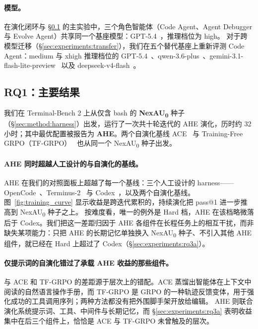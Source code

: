 \paragraph{模型。}
在演化闭环与 \S\ref{sec:experiments:main} 的主实验中，三个角色智能体（Code Agent、Agent Debugger 与 Evolve Agent）共享同一个基座模型：GPT-5.4~\citep{openaiIntroducingGPT542026}，推理档位为 high。
对于跨模型迁移（\S\ref{sec:experiments:transfer}），我们在五个替代基座上重新评测 Code Agent：medium 与 xhigh 推理档位的 GPT-5.4~\citep{openaiIntroducingGPT542026}、qwen-3.6-plus~\citep{teamQwen36PlusRealWorld2026,yangQwen3TechnicalReport2025a}、gemini-3.1-flash-lite-preview~\citep{googleGemini31FlashLiteModelCard2026} 以及 deepseek-v4-flash~\citep{DeepSeek_V4pdfDeepseekaiDeepSeekV4Pro2026}。

\subsection{RQ1：主要结果}
\label{sec:experiments:main}

% 


我们在 Terminal-Bench 2 上从仅含 bash 的 \textbf{NexAU\textsubscript{0}} 种子（\S\ref{sec:method:harness}）出发，运行了一次共十轮迭代的 AHE 演化，历时约 32 小时；其中最优配置被报告为 \textbf{AHE}。两个自演化基线 ACE~\citep{zhangAgenticContextEngineering2025a} 与 Training-Free GRPO（TF-GRPO）~\citep{caiTrainingFreeGroupRelative2025} 也从同一个 NexAU\textsubscript{0} 种子出发。

\paragraph{AHE 同时超越人工设计的与自演化的基线。}
AHE 在我们的对照面板上超越了每一个基线：三个人工设计的 harness——OpenCode~\citep{anomalyOpencodeOpenSource2025}、Terminus-2~\citep{harborTerminus22026} 与 Codex~\citep{openaiCodexCLI2025}，以及两个自演化基线。
图~\ref{fig:training_curve} 显示收益是跨迭代累积的，持续演化把 pass@1 进一步推高到 NexAU\textsubscript{0} 种子之上。
按难度看，唯一的例外是 Hard 档，AHE 在该档略微落后于 Codex。我们把这一差距归因于 AHE 各组件在长程任务上的相互干扰，而非缺失某项能力：只把 AHE 的长期记忆单独换入 NexAU\textsubscript{0} 种子、不引入其他 AHE 组件，就已经在 Hard 上超过了 Codex（\S\ref{sec:experiments:rq3a}）。

\paragraph{仅提示词的自演化错过了承载 AHE 收益的那些组件。}
与 ACE 和 TF-GRPO 的差距源于层次上的错配。ACE 蒸馏出智能体在上下文中阅读的自然语言操作手册，而 TF-GRPO 是 GRPO 的一种轨迹反馈变体，用于强化成功的工具调用序列；两种方法都没有把外围脚手架开放给编辑。
AHE 则联合演化系统提示词、工具、中间件与长期记忆，而 \S\ref{sec:experiments:rq3a} 表明收益集中在后三个组件上，恰恰是 ACE 与 TF-GRPO 未曾触及的层次。

